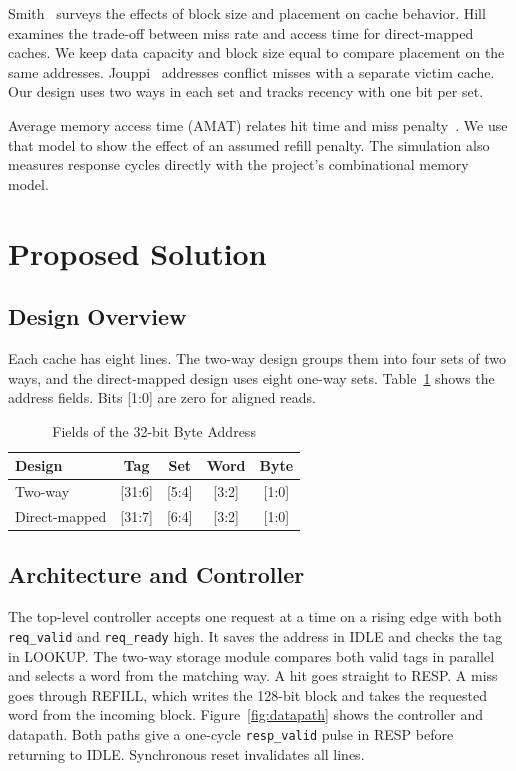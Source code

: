 \documentclass[conference]{IEEEtran}
\begin{document}
Smith~\cite{smith1982} surveys the effects of block size and placement on
cache behavior. Hill~\cite{hill1988} examines the trade-off between miss
rate and access time for direct-mapped caches. We keep data capacity and
block size equal to compare placement on the same addresses.
Jouppi~\cite{jouppi1990} addresses conflict misses with a separate victim cache.
Our design uses two ways in each set and tracks recency with one bit per
set.

Average memory access time (AMAT) relates hit time and miss
penalty~\cite{patterson2017}. We use that model to show the effect of an
assumed refill penalty. The simulation also measures response cycles
directly with the project's combinational memory model.

\section{Proposed Solution}

\subsection{Design Overview}

Each cache has eight lines. The two-way design groups them into four sets
of two ways, and the direct-mapped design uses eight one-way sets.
Table~\ref{tab:address} shows the address fields. Bits [1:0] are zero for
aligned reads.

\begin{table}[ht]
\centering
\caption{Fields of the 32-bit Byte Address}
\label{tab:address}
\begin{tabular}{@{}lcccc@{}}
\toprule
Design & Tag & Set & Word & Byte \\
\midrule
Two-way       & [31:6] & [5:4] & [3:2] & [1:0] \\
Direct-mapped & [31:7] & [6:4] & [3:2] & [1:0] \\
\bottomrule
\end{tabular}
\end{table}

\subsection{Architecture and Controller}

The top-level controller accepts one request at a time on a rising edge
with both \texttt{req\_valid} and \texttt{req\_ready} high. It saves the
address in IDLE and checks the tag in LOOKUP. The two-way storage module
compares both valid tags in parallel and selects a word from the matching
way. A hit goes straight to RESP. A miss goes through REFILL, which writes
the 128-bit block and takes the requested word from the incoming block.
Figure~\ref{fig:datapath} shows the controller and datapath.
Both paths give a one-cycle \texttt{resp\_valid} pulse in RESP before
returning to IDLE. Synchronous reset invalidates all lines.
\end{document}
